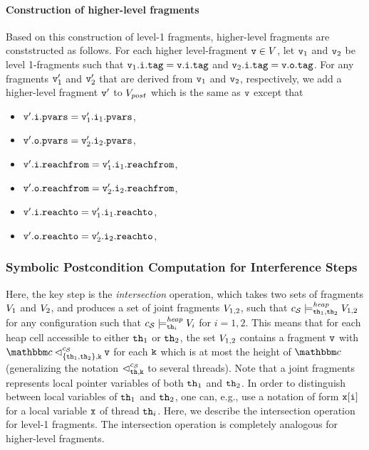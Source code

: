 \paragraph{{\bf Construction of higher-level fragments}}
Based on this construction of level-1 fragments, higher-level fragments are
   conststructed as follows.
     For each higher level-fragment $\mathtt{v} \in V$, let
     $\mathtt{v}_1$ and $\mathtt{v}_2$ be level 1-fragments such that
     $\mathtt{v}_1.\mathtt{i}.\mathtt{tag} = \mathtt{v}.\mathtt{i}.\mathtt{tag}$ and
     $\mathtt{v}_2.\mathtt{i}.\mathtt{tag} = \mathtt{v}.\mathtt{o}.\mathtt{tag}$.
     For any fragments $\mathtt{v}_1'$ and $\mathtt{v}_2'$ that are derived from
     $\mathtt{v}_1$ and $\mathtt{v}_2$, respectively, we add a higher-level
     fragment $\mathtt{v}'$ to $V_{post}$
     which is the same as $\mathtt{v}$ except that 
\begin{itemize}
\item $\mathtt{v}'.\mathtt{i}.\mathtt{pvars} = \mathtt{v}_1'.\mathtt{i}_1.\mathtt{pvars}$,
\item $\mathtt{v}'.\mathtt{o}.\mathtt{pvars} = \mathtt{v}_2'.\mathtt{i}_2.\mathtt{pvars}$,
\item $\mathtt{v}'.\mathtt{i}.\mathtt{reachfrom} = \mathtt{v}_1'.\mathtt{i}_1.\mathtt{reachfrom}$,
\item $\mathtt{v}'.\mathtt{o}.\mathtt{reachfrom} = \mathtt{v}_2'.\mathtt{i}_2.\mathtt{reachfrom}$,
\item $\mathtt{v}'.\mathtt{i}.\mathtt{reachto} = \mathtt{v}_1'.\mathtt{i}_1.\mathtt{reachto}$,
\item $\mathtt{v}'.\mathtt{o}.\mathtt{reachto} =  \mathtt{v}_2'.\mathtt{i}_2.\mathtt{reachto}$,
\end{itemize}


\subsubsection{Symbolic Postcondition Computation for Interference Steps} 
Here, the key step is the {\em intersection} operation, which
takes two sets of fragments
$V_1$ and $V_2$, and produces a set of joint fragments
$V_{1,2}$, such that
$c_{\mathcal S} \models_{{\tt th}_1,{\tt th}_2}^{\mathit{heap}} V_{1,2}$ for any configuration
such that
$c_{\mathcal S} \models_{{\tt th}_i}^{\mathit{heap}} V_i$ for $i=1,2$.
This means that for each heap cell accessible to either
${\tt th}_1$ or ${\tt th}_2$, the set $V_{1,2}$ 
contains a fragment $\mathtt{v}$ with $\cell \lsatfrag{\klevel}{\{\thread_1,\thread_2\}}{\sconf} \frag$ for each ${\tt k}$ which is at most the height of $\cell$
(generalizing the notation  $\lhd_{{\tt th},{\tt k}}^{c_{\mathcal S}}$ to several
threads).
Note that a joint fragments represents local pointer variables of
both ${\tt th}_1$ and ${\tt th}_2$. In order to distinguish
between local variables of ${\tt th}_1$ and ${\tt th}_2$, one can, e.g.,
use a notation of form
$\mathtt{x[i]}$ for a local variable $\mathtt{x}$ of thread ${\tt th}_i$.
Here, we describe the intersection operation for level-1 fragments. The
intersection operation is completely analogous for higher-level fragments.

